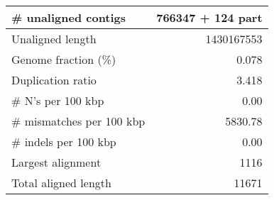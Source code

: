 \documentclass[12pt,a4paper]{article}
\begin{document}
\begin{table}[ht]
\begin{center}
\begin{tabular}{|l*{1}{|r}|}
\# unaligned contigs & 766347 + 124 part \\ \hline
Unaligned length & 1430167553 \\ \hline
Genome fraction (\%) & 0.078 \\ \hline
Duplication ratio & 3.418 \\ \hline
\# N's per 100 kbp & 0.00 \\ \hline
\# mismatches per 100 kbp & 5830.78 \\ \hline
\# indels per 100 kbp & 0.00 \\ \hline
Largest alignment & 1116 \\ \hline
Total aligned length & 11671 \\ \hline
\end{tabular}
\end{center}
\end{table}
\end{document}

